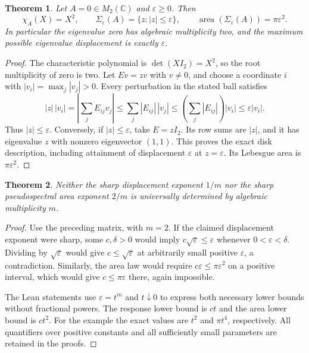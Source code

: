 \documentclass[11pt]{article}
\newtheorem{theorem}{Theorem}
\begin{document}
\begin{theorem}
Let $A=0\in M_2(\mathbb C)$ and $\varepsilon\ge0$. Then
\[
 \chi_A(X)=X^2,\qquad
 \Sigma_\varepsilon(A)=\{z:|z|\le\varepsilon\},\qquad
 \operatorname{area}(\Sigma_\varepsilon(A))=\pi\varepsilon^2.
\]
In particular the eigenvalue zero has algebraic multiplicity two,
and the maximum possible eigenvalue displacement is exactly
$\varepsilon$.
\end{theorem}
\begin{proof}
The characteristic polynomial is $\det(XI_2)=X^2$, so the root
multiplicity of zero is two. Let $Ev=zv$ with $v\ne0$, and choose a
coordinate $i$ with $|v_i|=\max_j|v_j|>0$. Every perturbation in the
stated ball satisfies
\[
 |z|\,|v_i|
 =\left|\sum_jE_{ij}v_j\right|
 \le\sum_j|E_{ij}|\,|v_j|
 \le\left(\sum_j|E_{ij}|\right)|v_i|
 \le\varepsilon|v_i|.
\]
Thus $|z|\le\varepsilon$. Conversely, if $|z|\le\varepsilon$,
take $E=zI_2$. Its row sums are $|z|$, and it has eigenvalue $z$
with nonzero eigenvector $(1,1)$. This proves the exact disk
description, including attainment of displacement $\varepsilon$ at
$z=\varepsilon$. Its Lebesgue area is $\pi\varepsilon^2$.
\end{proof}

\begin{theorem}
Neither the sharp displacement exponent $1/m$ nor the sharp
pseudospectral area exponent $2/m$ is universally determined by
algebraic multiplicity $m$.
\end{theorem}
\begin{proof}
Use the preceding matrix, with $m=2$. If the claimed displacement
exponent were sharp, some $c,\delta>0$ would imply
$c\sqrt\varepsilon\le\varepsilon$ whenever
$0<\varepsilon<\delta$. Dividing by $\sqrt\varepsilon$ would give
$c\le\sqrt\varepsilon$ at arbitrarily small positive
$\varepsilon$, a contradiction. Similarly, the area law would require
$c\varepsilon\le\pi\varepsilon^2$ on a positive interval, which would
give $c\le\pi\varepsilon$ there, again impossible.

The Lean statements use $\varepsilon=t^m$ and $t\downarrow0$ to
express both necessary lower bounds without fractional powers. The
response lower bound is $ct$ and the area lower bound is $ct^2$.
For the example the exact values are $t^2$ and $\pi t^4$,
respectively. All quantifiers over positive constants and all
sufficiently small parameters are retained in the proofs.
\end{proof}
\end{document}
